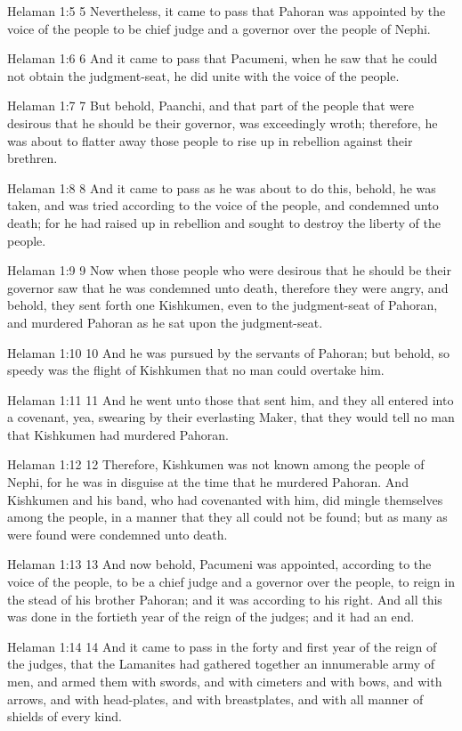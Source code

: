 Helaman 1:5
 5 Nevertheless, it came to pass that Pahoran was appointed by
the voice of the people to be chief judge and a governor over the
people of Nephi.

Helaman 1:6
 6 And it came to pass that Pacumeni, when he saw that he could
not obtain the judgment-seat, he did unite with the voice of the
people.

Helaman 1:7
 7 But behold, Paanchi, and that part of the people that were
desirous that he should be their governor, was exceedingly wroth;
therefore, he was about to flatter away those people to rise up
in rebellion against their brethren.

Helaman 1:8
 8 And it came to pass as he was about to do this, behold, he was
taken, and was tried according to the voice of the people, and
condemned unto death; for he had raised up in rebellion and
sought to destroy the liberty of the people.

Helaman 1:9
 9 Now when those people who were desirous that he should be
their governor saw that he was condemned unto death, therefore
they were angry, and behold, they sent forth one Kishkumen, even
to the judgment-seat of Pahoran, and murdered Pahoran as he sat
upon the judgment-seat.

Helaman 1:10
 10 And he was pursued by the servants of Pahoran; but behold, so
speedy was the flight of Kishkumen that no man could overtake
him.

Helaman 1:11
 11 And he went unto those that sent him, and they all entered
into a covenant, yea, swearing by their everlasting Maker, that
they would tell no man that Kishkumen had murdered Pahoran.

Helaman 1:12
 12 Therefore, Kishkumen was not known among the people of Nephi,
for he was in disguise at the time that he murdered Pahoran. And
Kishkumen and his band, who had covenanted with him, did mingle
themselves among the people, in a manner that they all could not
be found; but as many as were found were condemned unto death.

Helaman 1:13
 13 And now behold, Pacumeni was appointed, according to the
voice of the people, to be a chief judge and a governor over the
people, to reign in the stead of his brother Pahoran; and it was
according to his right. And all this was done in the fortieth
year of the reign of the judges; and it had an end.

Helaman 1:14
 14 And it came to pass in the forty and first year of the reign
of the judges, that the Lamanites had gathered together an
innumerable army of men, and armed them with swords, and with
cimeters and with bows, and with arrows, and with head-plates,
and with breastplates, and with all manner of shields of every
kind.

